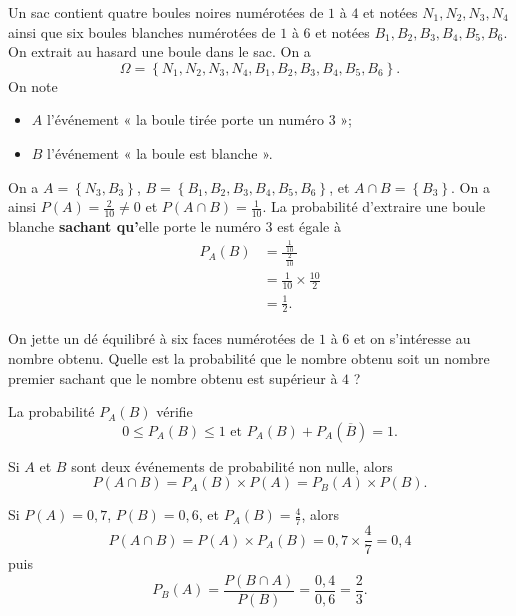 \documentclass[11pt]{article}
\begin{document}
\begin{exemple}
  Un sac contient quatre boules noires numérotées de $1$ à $4$ et notées $N_1,
  N_2, N_3, N_4$ ainsi que six boules blanches numérotées de $1$ à $6$ et notées
  $B_1, B_2, B_3, B_4, B_5, B_6$. On extrait au hasard une boule dans le sac. On
  a
  \[
    \Omega=\left\{ N_1, N_2, N_3, N_4, B_1, B_2, B_3, B_4, B_5, B_6 \right\}.
  \]
  On note

  \begin{itemize}
    \item $A$ l'événement « la boule tirée porte un numéro $3$ »;
    \item $B$ l'événement « la boule est blanche ».
  \end{itemize}
  On a $A=\left\{ N_3, B_3 \right\}$, $B=\left\{B_1, B_2, B_3, B_4, B_5, B_6
  \right\}$, et $A\cap B=\left\{ B_3 \right\}$. On a ainsi
  $P(A)=\frac{2}{10}\neq0$ et $P(A\cap B)=\frac{1}{10}$. La probabilité
  d'extraire une boule blanche \textbf{sachant qu'}elle porte le numéro $3$ est
  égale à
  \begin{align*}
    P_A(B) &=\frac{\;\frac{1}{10}\;}{\frac{2}{10}} \\
    &= \frac{1}{10}\times\frac{10}{2} \\
    &= \frac{1}{2}.
  \end{align*}
\end{exemple}

\begin{app}
  On jette un dé équilibré à six faces numérotées de $1$ à $6$ et on s'intéresse
  au nombre obtenu. Quelle est la probabilité que le nombre obtenu soit un
  nombre premier sachant que le nombre obtenu est supérieur à $4$ ?
\end{app}

\begin{prop}
  La probabilité $P_A(B)$ vérifie
  \[
    0\leq P_A(B)\leq 1\text{ et }P_A(B)+P_A(\overline{B})=1.
  \]
\end{prop}

\begin{prop}
  Si $A$ et $B$ sont deux événements de probabilité non nulle, alors
  \[
  P(A\cap B) = P_A(B)\times P(A) = P_B(A)\times P(B).
  \]
  \label{prop:1}
\end{prop}

\begin{exemple}
  Si $P(A)=0,7$, $P(B)=0,6$, et $P_A(B)=\frac{4}{7}$, alors
  \[
    P(A\cap B)=P(A)\times P_A(B) = 0,7\times\frac{4}{7}=0,4
  \]
  puis
  \[
    P_B(A) = \frac{P(B\cap A)}{P(B)} = \frac{0,4}{0,6}=\frac{2}{3}.
  \]
\end{exemple}
\end{document}
